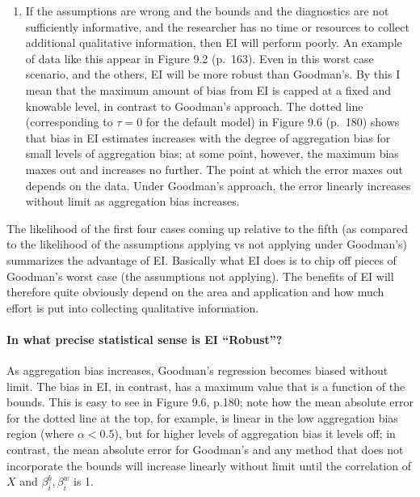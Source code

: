 \documentclass[11pt,titlepage]{article}
\begin{document}
\begin{enumerate}
\item If the assumptions are wrong and the bounds and the diagnostics
  are not sufficiently informative, and the researcher has no time or
  resources to collect additional qualitative information, then EI
  will perform poorly.  An example of data like this appear in Figure
  9.2 (p.\ 163).  Even in this worst case scenario, and the others, EI
  will be more robust than Goodman's.  By this I mean that the maximum
  amount of bias from EI is capped at a fixed and knowable level, in
  contrast to Goodman's approach.  The dotted line (corresponding to
  $\tau=0$ for the default model) in Figure 9.6 (p.\ 180) shows that
  bias in EI estimates increases with the degree of aggregation bias
  for small levels of aggregation bias; at some point, however, the
  maximum bias maxes out and increases no further.  The point at which
  the error maxes out depends on the data.  Under Goodman's approach,
  the error linearly increases without limit as aggregation bias
  increases.
\end{enumerate}
The likelihood of the first four cases coming up relative to the fifth
(as compared to the likelihood of the assumptions applying vs not
applying under Goodman's) summarizes the advantage of EI.  Basically
what EI does is to chip off pieces of Goodman's worst case (the
assumptions not applying).  The benefits of EI will therefore quite
obviously depend on the area and application and how much effort is
put into collecting qualitative information.

\paragraph{In what precise statistical sense is EI ``Robust''?}
As aggregation bias increases, Goodman's regression becomes biased
without limit.  The bias in EI, in contrast, has a maximum value that
is a function of the bounds.  This is easy to see in Figure 9.6,
p.180; note how the mean absolute error for the dotted line at the
top, for example, is linear in the low aggregation bias region (where
$\alpha<0.5$), but for higher levels of aggregation bias it levels
off; in contrast, the mean absolute error for Goodman's and any method
that does not incorporate the bounds will increase linearly without
limit until the correlation of $X$ and $\beta_i^b,\beta_i^w$ is 1.
\end{document}
